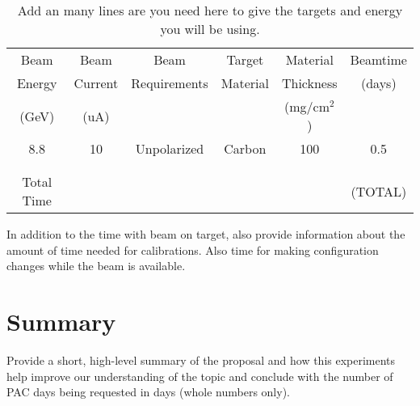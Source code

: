 \documentclass[titlepage,10pt]{article}
\begin{document}
\begin{table}[h!]
    \centering
\begin{tabular}{cccccc}
Beam   & Beam    & Beam         & Target   & Material    & Beamtime   \\
Energy & Current & Requirements & Material & Thickness   & (days) \\
(GeV)  & (uA)    &              &          & (mg/cm$^2$) &        \\
\hline
8.8    & 10      & Unpolarized  & Carbon   & 100         & 0.5    \\
       &         &              &          &             &        \\
       &         &              &          &             &        \\
\hline
Total Time &     &              &          &             & (TOTAL) \\
\end{tabular}
    \caption{Add an many lines are you need here to give the targets and energy you will be using.    }
    \label{tab:my_label}
\end{table}

In addition to the time with beam on target, also provide information about the amount of time needed for calibrations.    Also time for making configuration changes while the beam is available.

\section{Summary}

Provide a short, high-level summary of the proposal and how this experiments help improve our understanding of the topic and conclude with the number of PAC days being requested in days (whole numbers only).

%
%
%


%
%
%
%


\end{document}
